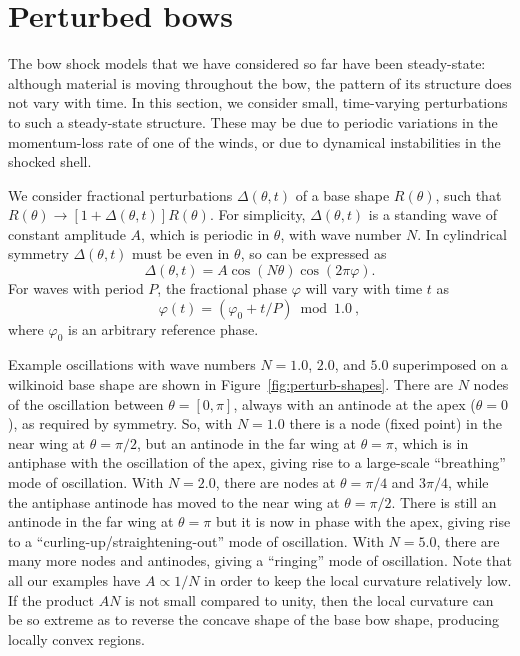 \section{Perturbed bows}
\label{sec:perturbed-bows}

The bow shock models that we have considered so far have been
steady-state: although material is moving throughout the bow, the
pattern of its structure does not vary with time.  In this section, we
consider small, time-varying perturbations to such a steady-state
structure.  These may be due to periodic variations in the
momentum-loss rate of one of the winds, or due to dynamical
instabilities in the shocked shell.

We consider fractional perturbations \(\Delta(\theta, t)\) of a base shape
\(R(\theta)\), such that
\(R(\theta) \to [1 + \Delta(\theta, t)] R(\theta)\).  For simplicity,
\(\Delta(\theta, t)\) is a standing wave of constant amplitude \(A\), which is
periodic in \(\theta\), with wave number \(N\).  In cylindrical symmetry
\(\Delta(\theta, t)\) must be even in \(\theta\), so can be expressed as
\begin{equation}
  \label{eq:standing-wave}
  \Delta(\theta, t) = A \cos(N \theta) \cos(2\pi \varphi) . 
\end{equation}
For waves with period \(P\), the fractional phase \(\varphi\) will
vary with time \(t\) as
\begin{equation}
  \label{eq:fractional-phase}
  \varphi(t) = (\varphi_0 + t/P) \bmod 1.0\ ,
\end{equation}
where \(\varphi_0\) is an arbitrary reference phase.

Example oscillations with wave numbers \(N = 1.0\), \(2.0\), and
\(5.0\) superimposed on a wilkinoid base shape are shown in
Figure~\ref{fig:perturb-shapes}.  There are \(N\) nodes of the
oscillation between \(\theta = [0, \pi]\), always with an antinode at the apex
(\(\theta = 0\)), as required by symmetry.  So, with \(N = 1.0\) there is a
node (fixed point) in the near wing at \(\theta = \pi/2\), but an antinode in
the far wing at \(\theta = \pi\), which is in antiphase with the oscillation
of the apex, giving rise to a large-scale ``breathing'' mode of
oscillation.  With \(N = 2.0\), there are nodes at \(\theta = \pi/4\) and
\(3\pi/4\), while the antiphase antinode has moved to the near wing at
\(\theta = \pi/2\).  There is still an antinode in the far wing at
\(\theta = \pi\) but it is now in phase with the apex, giving rise to a
``curling-up/straightening-out'' mode of oscillation.  With
\(N = 5.0\), there are many more nodes and antinodes, giving a
``ringing'' mode of oscillation.  Note that all our examples have
\(A \propto 1/N\) in order to keep the local curvature relatively low.  If
the product \(A N\) is not small compared to unity, then the local
curvature can be so extreme as to reverse the concave shape of the
base bow shape, producing locally convex regions.

